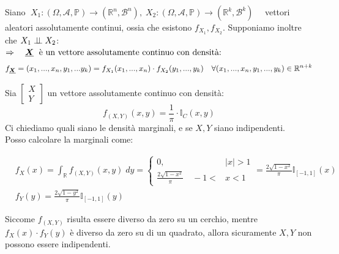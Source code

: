 \begin{teorema}
    Siano $\;X_1:(\Omega, \mathcal{A}, \mathbb{P})\to (\mathbb{R}^n, \mathcal{B}^n), \;X_2:(\Omega, \mathcal{A}, \mathbb{P})\to (\mathbb{R}^k, \mathcal{B}^k) \quad $ vettori aleatori assolutamente continui, ossia che esistono $f_{X_1}, f_{X_2}$. Supponiamo inoltre che $X_1\mathrel{\perp\!\!\!\perp} X_2$:\\
    \(\Rightarrow\quad \underline{{\boldsymbol{X}}}\; \text{ è un vettore assolutamente continuo con densità:}\)
    \[f_{\underline{{\boldsymbol{X}}}} = (x_1, ..., x_n, y_1, ...y_k) = f_{X_1}(x_1, ..., x_n)\cdot f_{X_2}(y_1, ..., y_k) \quad \forall (x_1, ..., x_n, y_1, ..., y_k)\in \mathbb{R}^{n+k}\]
\end{teorema}

\begin{esempio}
    Sia $\begin{bmatrix}
        X\\Y
    \end{bmatrix}$ un vettore assolutamente continuo con densità:
    \[f_{(X, Y)} (x, y) = \frac{1}{\pi}\cdot\mathbb{I}_C(x, y)\]
    Ci chiediamo quali siano le densità marginali, e se $X, Y$ siano indipendenti.\\
    Posso calcolare la marginali come:
    
    \begin{align*}
        &f_X(x) = \int_\mathbb{R}f_{(X, Y)}(x, y)\;dy = \begin{cases}
        0, \quad  &|x|>1\\
        \frac{2\sqrt{1-x^2}}{\pi} \quad  -1<&x<1
    \end{cases} = \frac{2\sqrt{1-x^2}}{\pi} \mathbb{I}_{[-1, 1]}(x)\\
    &f_Y(y) = \frac{2\sqrt{1-y^2}}{\pi} \mathbb{I}_{[-1, 1]}(y)
    \end{align*}

    \bigskip
    Siccome $f_{(X, Y)}$ risulta essere diverso da zero su un cerchio, mentre $f_X(x) \cdot f_Y(y)$ è diverso da zero su di un quadrato, allora sicuramente $X, Y$ non possono essere indipendenti.
\end{esempio}

